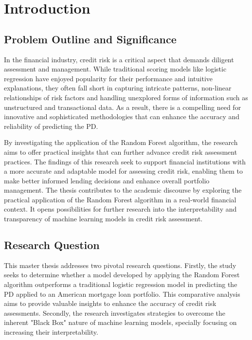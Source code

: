 \chapter{Introduction}
\section{Problem Outline and Significance}

In the financial industry, credit risk is a critical aspect that demands diligent assessment and management. While traditional scoring models like logistic regression have enjoyed popularity for their performance and intuitive explanations, they often fall short in capturing intricate patterns, non-linear relationships of risk factors and handling unexplored forms of information such as unstructured and transactional data. As a result, there is a compelling need for innovative and sophisticated methodologies that can enhance the accuracy and reliability of predicting the \ac{PD}.

By investigating the application of the Random Forest algorithm, the research aims to offer practical insights that can further advance credit risk assessment practices. The findings of this research seek to support financial institutions with a more accurate and adaptable model for assessing credit risk, enabling them to make better informed lending decisions and enhance overall portfolio management. The thesis contributes to the academic discourse by exploring the practical application of the Random Forest algorithm in a real-world financial context. It opens possibilities for further research into the interpretability and transparency of machine learning models in credit risk assessment.

\section{Research Question}

This master thesis addresses two pivotal research questions. Firstly, the study seeks to determine whether a model developed by applying the Random Forest algorithm outperforms a traditional logistic regression model in predicting the \ac{PD} applied to an American mortgage loan portfolio. This comparative analysis aims to provide valuable insights to enhance the accuracy of credit risk assessments. Secondly, the research investigates strategies to overcome the inherent "Black Box" nature of machine learning models, specially focusing on increasing their interpretability. 

